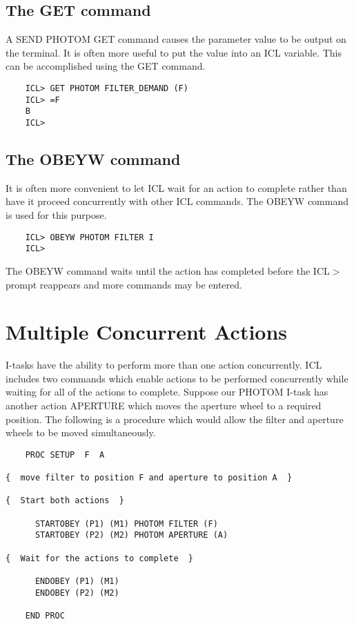 \documentclass[twoside,11pt]{report}
\newcommand{\xlabel}[1]{}
\begin{document}
\subsection{\xlabel{the_get_command}The GET command}

A SEND PHOTOM GET command causes the parameter value to be output on the
terminal. It is often more useful to put the value into an ICL variable.
This can be accomplished using the GET command.

\begin{verbatim}
    ICL> GET PHOTOM FILTER_DEMAND (F)
    ICL> =F
    B
    ICL>
\end{verbatim}

\subsection{\xlabel{the_obeyw_command}The OBEYW command}

It is often more convenient to let ICL wait for an action to complete rather than
have it proceed concurrently with other ICL commands. The OBEYW command
is used for this purpose.

\begin{verbatim}
    ICL> OBEYW PHOTOM FILTER I
    ICL>
\end{verbatim}

The OBEYW command waits until the action has completed before the ICL$>$
prompt reappears and more commands may be entered.

\section{\xlabel{multiple_concurrent_actions}Multiple Concurrent Actions}
                    
I-tasks have the ability to perform more than one action concurrently.
ICL includes two commands which enable actions to be performed concurrently
while waiting for all of the actions to complete. Suppose our PHOTOM
I-task has another action APERTURE which moves the aperture wheel to
a required position. The following is a procedure which would allow the
filter and aperture wheels to be moved simultaneously.

\begin{verbatim}
    PROC SETUP  F  A

{  move filter to position F and aperture to position A  }
      
{  Start both actions  }

      STARTOBEY (P1) (M1) PHOTOM FILTER (F)
      STARTOBEY (P2) (M2) PHOTOM APERTURE (A)
      
{  Wait for the actions to complete  }
                                        
      ENDOBEY (P1) (M1)
      ENDOBEY (P2) (M2)

    END PROC
\end{verbatim}          
\end{document}

